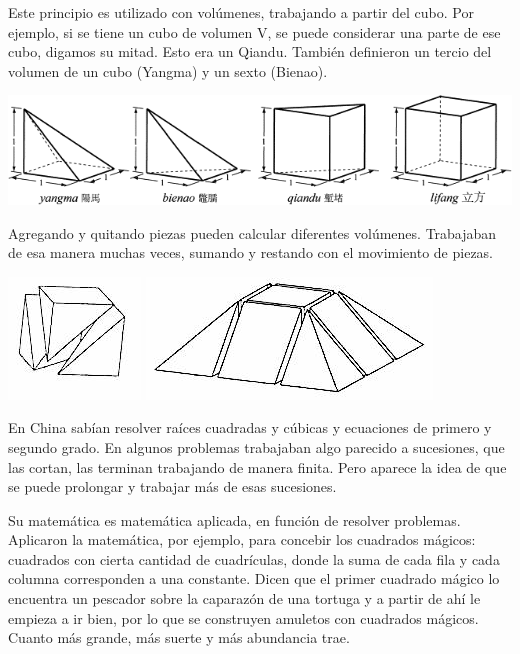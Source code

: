 Este principio es utilizado con volúmenes, trabajando a partir del cubo. Por ejemplo, si se tiene un cubo de volumen V, se puede considerar una parte de ese cubo, digamos su mitad. Esto era un Qiandu. También definieron un tercio del volumen de un cubo (Yangma) y un sexto (Bienao).
\begin{center}
\includegraphics[scale=0.6]{all}
\end{center}
Agregando y quitando piezas pueden calcular diferentes volúmenes. Trabajaban de esa manera muchas veces, sumando y restando con el movimiento de piezas.
\begin{center}
\includegraphics[scale=0.8]{image005.jpg}
\includegraphics[scale=0.8]{image007.jpg}
\end{center}
En China sabían resolver raíces cuadradas y cúbicas y ecuaciones de primero y segundo grado. En algunos problemas trabajaban algo parecido a sucesiones, que las cortan, las terminan trabajando de manera finita. Pero aparece la idea de que se puede prolongar y trabajar más de esas sucesiones.

Su matemática es matemática aplicada, en función de resolver problemas. Aplicaron la matemática, por ejemplo, para concebir los cuadrados mágicos: cuadrados con cierta cantidad de cuadrículas, donde la suma de cada fila y cada columna corresponden a una constante. Dicen que el primer cuadrado mágico lo encuentra un pescador sobre la caparazón de una tortuga y a partir de ahí le empieza a ir bien, por lo que se construyen amuletos con cuadrados mágicos. Cuanto más grande, más suerte y más abundancia trae.
